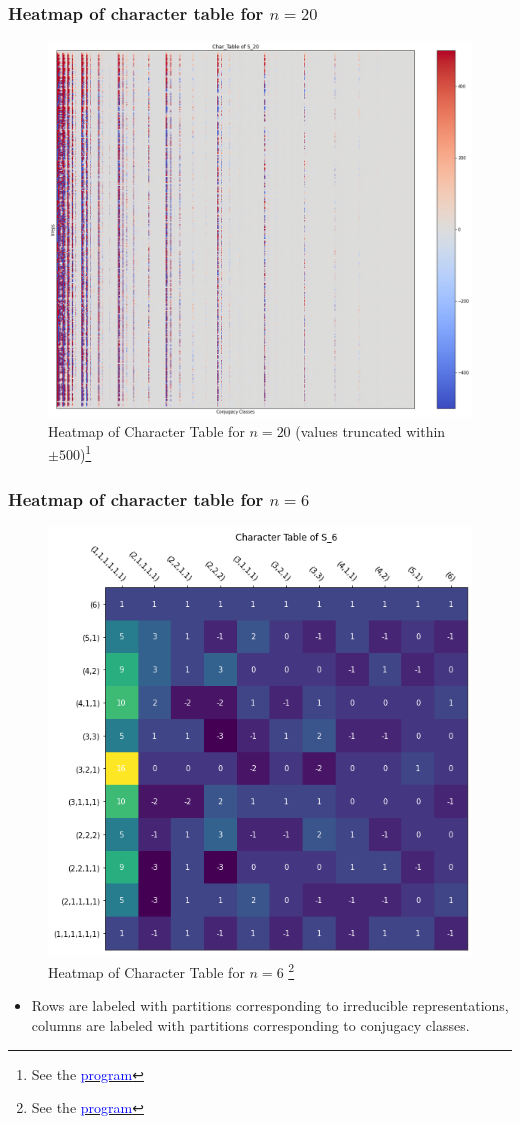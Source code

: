 \documentclass{beamer}
\begin{document}
\begin{frame}
\frametitle{Heatmap of character table for $n=20$}
\begin{figure}[H]
  \centering
  \includegraphics[width=0.6\linewidth]{char_table_20.png}
  \begin{center}
      \caption{\tiny Heatmap of Character Table for $n=20$ (values truncated within $\pm 500$)\footnote{ \tiny See the \href{https://github.com/TonyZhang2004/Character_Table_of_Symmetric_Groups/blob/main/char_table.ipynb}{\textcolor{blue}{program}}}}
  \end{center}
  
  \label{fig:char_20}
\end{figure}
\end{frame}

\begin{frame}
\frametitle{Heatmap of character table for $n=6$}

\begin{figure}[H]
  \centering
  \includegraphics[width=0.4\linewidth]{char_table_6_heatmap.png}
  \caption{Heatmap of Character Table for $n=6$ 
 \footnote{ \tiny See the \href{https://github.com/TonyZhang2004/Character_Table_of_Symmetric_Groups/blob/main/char_table.ipynb}{\textcolor{blue}{program}}}}
  \label{fig:char_6}
\end{figure}

\begin{itemize}
	\item Rows are labeled with partitions corresponding to irreducible representations, columns are labeled with partitions corresponding to conjugacy classes.
\end{itemize}

\end{frame}
\end{document}
